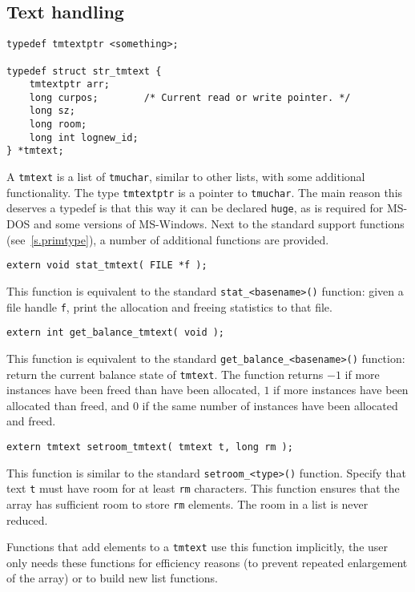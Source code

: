 \subsection{Text handling}
\label{s.tmtext}
\begin{verbatim}
typedef tmtextptr <something>;

typedef struct str_tmtext {
    tmtextptr arr;
    long curpos;        /* Current read or write pointer. */
    long sz;
    long room;
    long int lognew_id;
} *tmtext;
\end{verbatim}
\par
A \verb'tmtext' is a list of \verb'tmuchar', similar to other
lists, with some additional functionality. The type \verb'tmtextptr' is a
pointer to \verb'tmuchar'.
The main reason this deserves a typedef is that this way it can be declared
\verb'huge', as is required for MS-DOS and some versions of MS-Windows.
Next to the standard support functions (see~\ref{s.primtype}),
a number of additional functions are provided.
\begin{verbatim}
extern void stat_tmtext( FILE *f );
\end{verbatim}
\begin{desc}
This function is equivalent to the standard \verb'stat_<basename>()' function:
given a file handle \verb'f', print the allocation and freeing statistics
to that file.
\end{desc}
\begin{verbatim}
extern int get_balance_tmtext( void );
\end{verbatim}
\begin{desc}
This function is equivalent to the standard \verb'get_balance_<basename>()'
function: return the current balance state of \verb'tmtext'. 
The function returns $-1$ if more instances have been freed than have
been allocated, $1$ if more instances have been allocated than freed,
and $0$ if the same number of instances have been allocated and freed.
\end{desc}
\begin{verbatim}
extern tmtext setroom_tmtext( tmtext t, long rm );
\end{verbatim}
\begin{desc}
This function is similar to the standard \verb'setroom_<type>()'
function.
Specify that text {\tt t} must have room for at least {\tt rm} characters.
This function ensures that the array has sufficient room to
store {\tt rm} elements.
The room in a list is never reduced.
\par
Functions that add elements to a \verb'tmtext' use this function implicitly,
the user only needs these functions for efficiency reasons
(to prevent repeated enlargement of the array)
or to build new list functions.
\end{desc}
